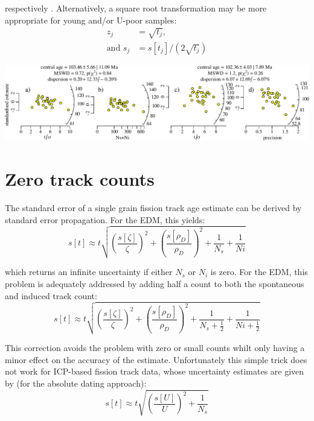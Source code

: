 \begin{refsection}
respectively \citep{galbraith2010b}. Alternatively, a square root
transformation may be more appropriate for young and/or U-poor
samples:
\begin{align}
  z_j & = \sqrt{{t}_j} \mbox{,}   \label{eq:zj3} \\
  \mbox{and~} s_j & = s[{t}_j]\bigg/\left(2\sqrt{{t}_j}\right)
  \label{eq:sj3}
\end{align}

\noindent\includegraphics[width=\linewidth]{../figures/FTradial.pdf}
\begingroup {}  \endgroup

\section{Zero track counts}
\label{sec:zeroICP}

The standard error of a single grain fission track age estimate can be
derived by standard error propagation.  For the EDM, this yields:
\begin{equation}
s[{t}] \approx {t} \sqrt{ 
  \left(\frac{s[{\zeta}]}{{\zeta}}\right)^2 +
  \left(\frac{s[{\rho_D}]}{{\rho_D}}\right)^2 +
  \frac{1}{N_s} + \frac{1}{Ni}
}
\label{eq:stEDM}
\end{equation}

\noindent which returns an infinite uncertainty if either $N_s$ or
$N_i$ is zero. For the EDM, this problem is adequately addressed by
adding half a count to both the spontaneous and induced track count:
\begin{equation}
s[{t}] \approx {t} \sqrt{ 
  \left(\frac{s[{\zeta}]}{{\zeta}}\right)^2 +
  \left(\frac{s[{\rho_D}]}{{\rho_D}}\right)^2 +
  \frac{1}{N_s+\frac{1}{2}} + \frac{1}{Ni+\frac{1}{2}}
}
\label{eq:stEDM0}
\end{equation}

This correction avoids the problem with zero or small counts whilt
only having a minor effect on the accuracy of the
estimate. Unfortunately this simple trick does not work for ICP-based
fission track data, whose uncertainty estimates are given by (for the
absolute dating approach):
\begin{equation}
s[{t}] \approx {t} \sqrt{ 
  \left(\frac{s[{U}]}{{U}}\right)^2 +
  \frac{1}{N_s}
}
\label{eq:shatt4}
\end{equation}


\end{refsection}
